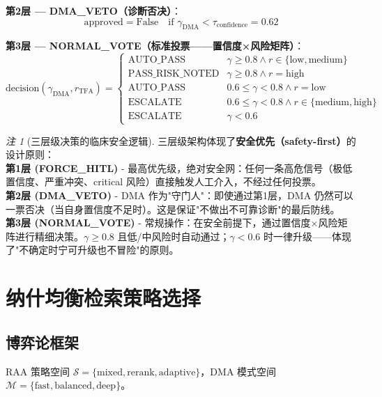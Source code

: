\documentclass[11pt,a4paper]{ctexart}
\theoremstyle{remark}
\newtheorem{remark}{注}[section]
\begin{document}
\textbf{第2层 — DMA\_VETO（诊断否决）}：
\begin{equation}
\text{approved} = \text{False} \quad \text{if } \gamma_{\text{DMA}} < \tau_{\text{confidence}} = 0.62
\end{equation}

\textbf{第3层 — NORMAL\_VOTE（标准投票——置信度×风险矩阵）}：
\begin{equation}
\text{decision}(\gamma_{\text{DMA}}, r_{\text{TFA}}) =
\begin{cases}
\text{AUTO\_PASS} & \gamma \geq 0.8 \land r \in \{\text{low}, \text{medium}\} \\
\text{PASS\_RISK\_NOTED} & \gamma \geq 0.8 \land r = \text{high} \\
\text{AUTO\_PASS} & 0.6 \leq \gamma < 0.8 \land r = \text{low} \\
\text{ESCALATE} & 0.6 \leq \gamma < 0.8 \land r \in \{\text{medium}, \text{high}\} \\
\text{ESCALATE} & \gamma < 0.6
\end{cases}
\end{equation}

\begin{remark}[三层级决策的临床安全逻辑]
三层级架构体现了\textbf{安全优先（safety-first）}的设计原则：
\\ \textbf{第1层 (FORCE\_HITL)} - 最高优先级，绝对安全网：任何一条高危信号（极低置信度、严重冲突、critical 风险）直接触发人工介入，不经过任何投票。
\\ \textbf{第2层 (DMA\_VETO)} - DMA 作为"守门人"：即使通过第1层，DMA 仍然可以一票否决（当自身置信度不足时）。这是保证"不做出不可靠诊断"的最后防线。
\\ \textbf{第3层 (NORMAL\_VOTE)} - 常规操作：在安全前提下，通过置信度×风险矩阵进行精细决策。$\gamma \geq 0.8$ 且低/中风险时自动通过；$\gamma < 0.6$ 时一律升级——体现了"不确定时宁可升级也不冒险"的原则。
\end{remark}

\section{纳什均衡检索策略选择}

\subsection{博弈论框架}

RAA 策略空间 $\mathcal{S} = \{\text{mixed}, \text{rerank}, \text{adaptive}\}$，DMA 模式空间 $\mathcal{M} = \{\text{fast}, \text{balanced}, \text{deep}\}$。
\end{document}
